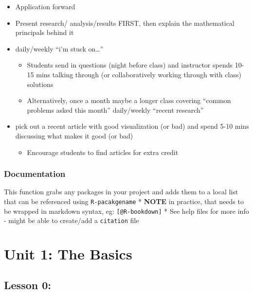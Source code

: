 \documentclass[
]{book}
\providecommand{\tightlist}{%
  \setlength{\itemsep}{0pt}\setlength{\parskip}{0pt}}
\begin{document}
\begin{itemize}
\tightlist
\item
  Application forward
\item
  Present research/ analysis/results FIRST, then explain the mathematical principals behind it
\item
  daily/weekly ``i'm stuck on\ldots{}''

  \begin{itemize}
  \tightlist
  \item
    Students send in questions (night before class) and instructor spends 10-15 mins talking through (or collaboratively working through with class) solutions
  \item
    Alternatively, once a month maybe a longer class covering ``common problems asked this month''
    daily/weekly ``recent research''
  \end{itemize}
\item
  pick out a recent article with good visualization (or bad) and spend 5-10 mins discussing what makes it good (or bad)

  \begin{itemize}
  \tightlist
  \item
    Encourage students to find articles for extra credit
  \end{itemize}
\end{itemize}

\hypertarget{documentation}{%
\subsection*{Documentation}\label{documentation}}

This function grabs any packages in your project and adds them to a local list that can be referenced using \texttt{R-pacakgename}
* \textbf{NOTE} in practice, that needs to be wrapped in markdown syntax, eg:
\texttt{{[}@R-bookdown{]}}
* See help files for more info - might be able to create/add a \texttt{citation} file

\hypertarget{unit-1-the-basics}{%
\chapter*{Unit 1: The Basics}\label{unit-1-the-basics}}

\hypertarget{lesson-0}{%
\section*{Lesson 0:}\label{lesson-0}}
\end{document}
